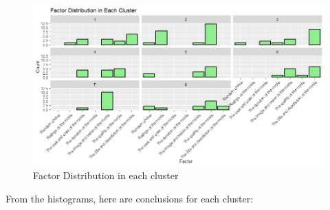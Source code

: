     \begin{figure}[H]
        \centering
        \includegraphics[scale=0.6]{graphics/dummy/distribution/FactorDistribution.png}
        \caption{Factor Distribution in each cluster}
    \end{figure}

From the histograms, here are conclusions for each cluster:

